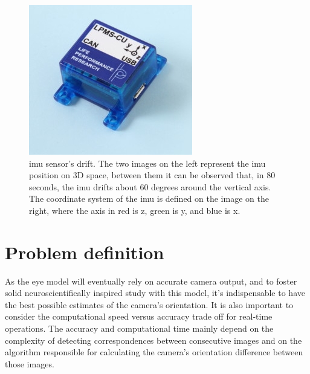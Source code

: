 \begin{figure}[ht]
\begin{minipage}[b]{0.3\linewidth}
	\end{minipage}
	\hspace{0.5cm}
	\begin{minipage}[b]{0.3\linewidth}
		\centering
		\includegraphics[width=\textwidth]{images/lpmscu.jpg}
	\end{minipage}
	\caption[ \acrshort{imu} sensor's drift]{ \acrshort{imu} sensor's drift. The two images on the left represent the  \acrshort{imu} position on 3D space, between them it can be observed that, in 80 seconds, the  \acrshort{imu} drifts about 60 degrees around the vertical axis. The coordinate system of the \acrshort{imu} is defined on the image on the right, where the axis in red is z, green is y, and blue is x.}
	\label{cha1:sec1:fig:imu}
\end{figure}

\section{Problem definition}
\label{cha1:problemdef}
As the eye model will eventually rely on accurate camera output, and to foster solid neuroscientifically inspired study with this model, it's indispensable to have the best possible estimates of the camera's orientation. It is also important to consider the computational speed versus accuracy trade off for real-time operations. The accuracy and computational time mainly depend on the complexity of detecting correspondences between consecutive images and on the algorithm responsible for calculating the camera's orientation difference between those images. 

